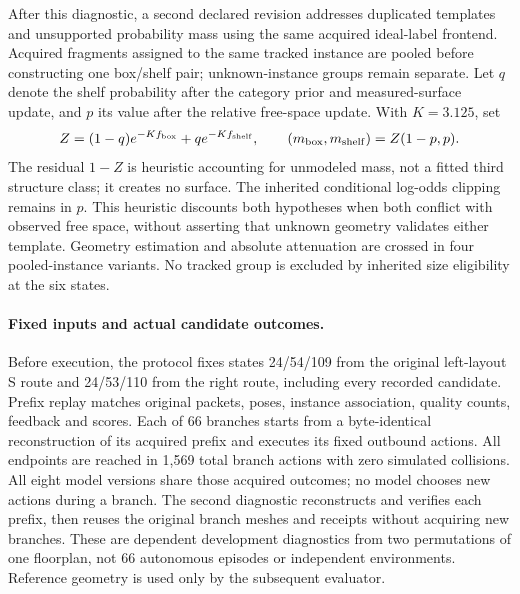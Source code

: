 After this diagnostic, a second declared revision addresses duplicated templates and unsupported probability mass using the same acquired ideal-label frontend. Acquired fragments assigned to the same tracked instance are pooled before constructing one box/shelf pair; unknown-instance groups remain separate. Let $q$ denote the shelf probability after the category prior and measured-surface update, and $p$ its value after the relative free-space update. With $K=3.125$, set
\[
Z=(1-q)e^{-Kf_{\rm box}}+qe^{-Kf_{\rm shelf}},\qquad
(m_{\rm box},m_{\rm shelf})=Z(1-p,p).
\]
The residual $1-Z$ is heuristic accounting for unmodeled mass, not a fitted third structure class; it creates no surface. The inherited conditional log-odds clipping remains in $p$. This heuristic discounts both hypotheses when both conflict with observed free space, without asserting that unknown geometry validates either template. Geometry estimation and absolute attenuation are crossed in four pooled-instance variants. No tracked group is excluded by inherited size eligibility at the six states.

\paragraph{Fixed inputs and actual candidate outcomes.}
Before execution, the protocol fixes states 24/54/109 from the original left-layout S route and 24/53/110 from the right route, including every recorded candidate. Prefix replay matches original packets, poses, instance association, quality counts, feedback and scores. Each of 66 branches starts from a byte-identical reconstruction of its acquired prefix and executes its fixed outbound actions. All endpoints are reached in 1,569 total branch actions with zero simulated collisions. All eight model versions share those acquired outcomes; no model chooses new actions during a branch. The second diagnostic reconstructs and verifies each prefix, then reuses the original branch meshes and receipts without acquiring new branches. These are dependent development diagnostics from two permutations of one floorplan, not 66 autonomous episodes or independent environments. Reference geometry is used only by the subsequent evaluator.



